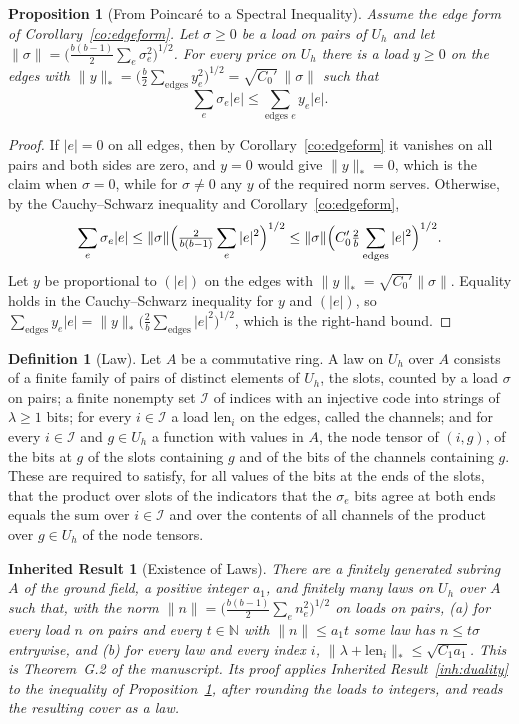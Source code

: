 \documentclass[11pt,letterpaper]{report}
\theoremstyle{plain}
\newtheorem{proposition}[theorem]{Proposition}
\newtheorem{inherited}[theorem]{Inherited Result}
\theoremstyle{definition}
\newtheorem{definition}[theorem]{Definition}
\theoremstyle{remark}
\begin{document}
\begin{proposition}[From Poincar\'e to a Spectral Inequality]\label{pr:poincspec}
Assume the edge form of Corollary~\ref{co:edgeform}. Let $\sigma\ge0$ be a load on pairs of $U_h$ and let $\|\sigma\|=\bigl(\tfrac{b(b-1)}2\sum_e\sigma_e^2\bigr)^{1/2}$. For every price on $U_h$ there is a load $y\ge0$ on the edges with $\|y\|_*=\bigl(\tfrac b2\sum_{\text{edges}}y_e^2\bigr)^{1/2}=\sqrt{C_0'}\,\|\sigma\|$ such that
\[
\sum_e\sigma_e|e|\le\sum_{\text{edges }e}y_e|e|.
\]
\end{proposition}
\begin{proof}
If $|e|=0$ on all edges, then by Corollary~\ref{co:edgeform} it vanishes on all pairs and both sides are zero, and $y=0$ would give $\|y\|_*=0$, which is the claim when $\sigma=0$, while for $\sigma\ne0$ any $y$ of the required norm serves. Otherwise, by the Cauchy--Schwarz inequality and Corollary~\ref{co:edgeform},
\[
\sum_e\sigma_e|e|\le\|\sigma\|\Bigl(\tfrac2{b(b-1)}\sum_e|e|^2\Bigr)^{1/2}\le\|\sigma\|\Bigl(C_0'\tfrac2b\sum_{\text{edges}}|e|^2\Bigr)^{1/2}.
\]
Let $y$ be proportional to $(|e|)$ on the edges with $\|y\|_*=\sqrt{C_0'}\|\sigma\|$. Equality holds in the Cauchy--Schwarz inequality for $y$ and $(|e|)$, so $\sum_{\text{edges}}y_e|e|=\|y\|_*\bigl(\tfrac2b\sum_{\text{edges}}|e|^2\bigr)^{1/2}$, which is the right-hand bound.
\end{proof}

\begin{definition}[Law]\label{def:law}
Let $A$ be a commutative ring. A law on $U_h$ over $A$ consists of a finite family of pairs of distinct elements of $U_h$, the slots, counted by a load $\sigma$ on pairs; a finite nonempty set $\mathcal I$ of indices with an injective code into strings of $\lambda\ge1$ bits; for every $i\in\mathcal I$ a load $\mathrm{len}_i$ on the edges, called the channels; and for every $i\in\mathcal I$ and $g\in U_h$ a function with values in $A$, the node tensor of $(i,g)$, of the bits at $g$ of the slots containing $g$ and of the bits of the channels containing $g$. These are required to satisfy, for all values of the bits at the ends of the slots, that the product over slots of the indicators that the $\sigma_e$ bits agree at both ends equals the sum over $i\in\mathcal I$ and over the contents of all channels of the product over $g\in U_h$ of the node tensors.
\end{definition}

\begin{inherited}[Existence of Laws]\label{inh:laws}
There are a finitely generated subring $A$ of the ground field, a positive integer $a_1$, and finitely many laws on $U_h$ over $A$ such that, with the norm $\|n\|=\bigl(\tfrac{b(b-1)}2\sum_en_e^2\bigr)^{1/2}$ on loads on pairs, (a) for every load $n$ on pairs and every $t\in\mathbb N$ with $\|n\|\le a_1t$ some law has $n\le t\sigma$ entrywise, and (b) for every law and every index $i$, $\|\lambda+\mathrm{len}_i\|_*\le\sqrt{C_1a_1}$. This is Theorem~G.2 of the manuscript. Its proof applies Inherited Result~\ref{inh:duality} to the inequality of Proposition~\ref{pr:poincspec}, after rounding the loads to integers, and reads the resulting cover as a law.
\end{inherited}
\end{document}
